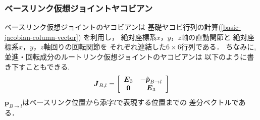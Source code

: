 \subsubsection{ベースリンク仮想ジョイントヤコビアン}
ベースリンク仮想ジョイントのヤコビアンは
基礎ヤコビ行列の計算(\eqref{basic-jacobian-column-vector})
を利用し，
絶対座標系$x$，$y$，$z$軸の直動関節と
絶対座標系$x$，$y$，$z$軸回りの回転関節を
それぞれ連結した$6\times6$行列である．
ちなみに,並進・回転成分のルートリンク仮想ジョイントのヤコビアンは
以下のように書き下すこともできる.
\begin{eqnarray}
\labeq{virtual-joint-jacobian}
\bm{J}_{B,l} = 
\left[
\begin{array}{cc}
\bm{E}_3 &
-\hat{\bm{p}}_{B\to l}\\
\bm{0} & \bm{E}_3
\end{array}
\right]
\end{eqnarray}
$\bm{p}_{B\to l}$はベースリンク位置から添字$l$で表現する位置までの
差分ベクトルである．


